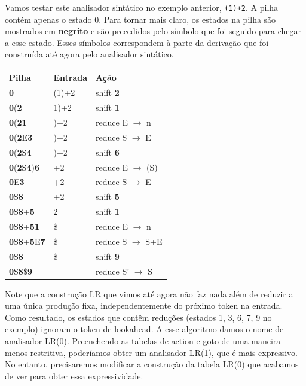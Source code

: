 Vamos testar este analisador sintático no exemplo anterior,
\verb|(1)+2|. A pilha contém apenas o estado 0.
Para tornar mais claro, os estados na pilha são mostrados em
\textbf{negrito} e são precedidos pelo símbolo que foi seguido para
chegar a esse estado. Esses símbolos correspondem à parte da
derivação que foi construída até agora pelo analisador sintático.
\begin{table}[H]
  \begin{tabular}{@{}lll@{}}
    \toprule
    Pilha & Entrada & Ação \\
    \midrule
    \textbf{0} & (1)+2 & shift \textbf{2} \\
    \textbf{0}(\textbf{2} & 1)+2 & shift \textbf{1} \\
    \textbf{0}(\textbf{21} & )+2 & reduce E $\to$ n \\
    \textbf{0}(\textbf{2}E\textbf{3} & )+2 & reduce S $\to$ E \\
    \textbf{0}(\textbf{2}S\textbf{4} & )+2 & shift \textbf{6} \\
    \textbf{0}(\textbf{2}S\textbf{4})\textbf{6} & +2 & reduce E $\to$ (S) \\
    \textbf{0}E\textbf{3} & +2 & reduce S $\to$ E \\
    \textbf{0}S\textbf{8} & +2 & shift \textbf{5} \\
    \textbf{0}S\textbf{8}+\textbf{5} & 2 & shift \textbf{1} \\
    \textbf{0}S\textbf{8}+\textbf{51} & \$ & reduce E $\to$ n \\
    \textbf{0}S\textbf{8}+\textbf{5}E\textbf{7} & \$ & reduce S $\to$ S+E \\
    \textbf{0}S\textbf{8} & \$ & shift \textbf{9} \\
    \textbf{0}S\textbf{8}\$\textbf{9} & & reduce S' $\to$ S \\
    \bottomrule
  \end{tabular}
  \centering
\end{table}

Note que a construção LR que vimos até agora não faz nada além de
reduzir a uma única produção fixa, independentemente do próximo token
na entrada. Como resultado, os estados que contêm reduções (estados
1, 3, 6, 7, 9 no exemplo) ignoram o token de lookahead. A esse
algoritmo damos o nome de analisador LR(0). Preenchendo as tabelas de
action e goto de uma maneira menos restritiva, poderíamos obter um
analisador LR(1), que é mais expressivo. No entanto, precisaremos
modificar a construção da tabela LR(0) que acabamos de ver para obter
essa expressividade.

